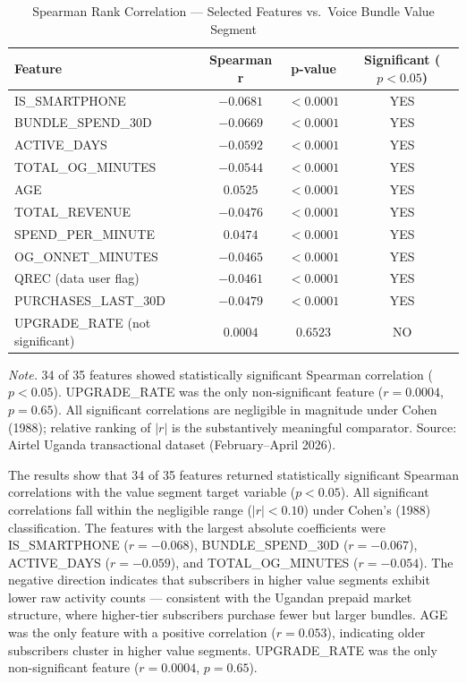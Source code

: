 \begin{table}[H]
\centering
\caption{Spearman Rank Correlation --- Selected Features vs.\ Voice Bundle Value Segment}
\label{tab:spearman}
\begin{tabular}{lccc}
\toprule
\textbf{Feature} & \textbf{Spearman r} & \textbf{p-value} & \textbf{Significant ($p < 0.05$)} \\
\midrule
IS\_SMARTPHONE                  & $-0.0681$ & $<0.0001$ & YES \\
BUNDLE\_SPEND\_30D              & $-0.0669$ & $<0.0001$ & YES \\
ACTIVE\_DAYS                    & $-0.0592$ & $<0.0001$ & YES \\
TOTAL\_OG\_MINUTES              & $-0.0544$ & $<0.0001$ & YES \\
AGE                              & $ 0.0525$ & $<0.0001$ & YES \\
TOTAL\_REVENUE                  & $-0.0476$ & $<0.0001$ & YES \\
SPEND\_PER\_MINUTE              & $ 0.0474$ & $<0.0001$ & YES \\
OG\_ONNET\_MINUTES              & $-0.0465$ & $<0.0001$ & YES \\
QREC (data user flag)           & $-0.0461$ & $<0.0001$ & YES \\
PURCHASES\_LAST\_30D            & $-0.0479$ & $<0.0001$ & YES \\
\midrule
UPGRADE\_RATE (not significant) & $ 0.0004$ & $0.6523$  & NO  \\
\bottomrule
\end{tabular}
\begin{flushleft}
\small\textit{Note.} 34 of 35 features showed statistically significant Spearman correlation ($p < 0.05$). UPGRADE\_RATE was the only non-significant feature ($r = 0.0004$, $p = 0.65$). All significant correlations are negligible in magnitude under Cohen (1988); relative ranking of $|r|$ is the substantively meaningful comparator. Source: Airtel Uganda transactional dataset (February--April 2026).
\end{flushleft}
\end{table}

The results show that 34 of 35 features returned statistically significant Spearman correlations with the value segment target variable ($p < 0.05$). All significant correlations fall within the negligible range ($|r| < 0.10$) under Cohen's (1988) classification. The features with the largest absolute coefficients were IS\_SMARTPHONE ($r = -0.068$), BUNDLE\_SPEND\_30D ($r = -0.067$), ACTIVE\_DAYS ($r = -0.059$), and TOTAL\_OG\_MINUTES ($r = -0.054$). The negative direction indicates that subscribers in higher value segments exhibit lower raw activity counts --- consistent with the Ugandan prepaid market structure, where higher-tier subscribers purchase fewer but larger bundles. AGE was the only feature with a positive correlation ($r = 0.053$), indicating older subscribers cluster in higher value segments. UPGRADE\_RATE was the only non-significant feature ($r = 0.0004$, $p = 0.65$).

